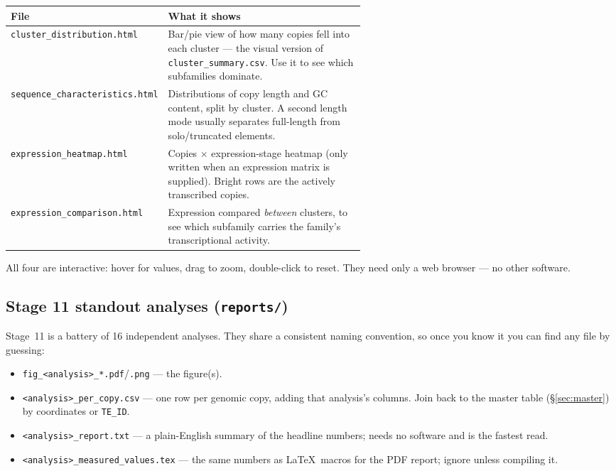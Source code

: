 \documentclass[11pt]{article}
\begin{document}
\begin{tabular}{@{}lp{0.58\linewidth}@{}}
\toprule
File & What it shows \\
\midrule
\texttt{cluster\_distribution.html}
  & Bar/pie view of how many copies fell into each cluster --- the visual
    version of \texttt{cluster\_summary.csv}. Use it to see which
    subfamilies dominate. \\[4pt]
\texttt{sequence\_characteristics.html}
  & Distributions of copy length and GC content, split by cluster.
    A second length mode usually separates full-length from
    solo/truncated elements. \\[4pt]
\texttt{expression\_heatmap.html}
  & Copies $\times$ expression-stage heatmap (only written when an
    expression matrix is supplied). Bright rows are the actively
    transcribed copies. \\[4pt]
\texttt{expression\_comparison.html}
  & Expression compared \emph{between} clusters, to see which subfamily
    carries the family's transcriptional activity. \\
\bottomrule
\end{tabular}

\medskip
All four are interactive: hover for values, drag to zoom, double-click to
reset. They need only a web browser --- no other software.

\subsection{Stage 11 standout analyses (\texttt{reports/})}
\label{sec:stage11}

Stage~11 is a battery of 16 independent analyses. They share a consistent
naming convention, so once you know it you can find any file by guessing:

\begin{itemize}[itemsep=2pt]
  \item \texttt{fig\_<analysis>\_*.pdf}/\texttt{.png} --- the figure(s).
  \item \texttt{<analysis>\_per\_copy.csv} --- one row per genomic copy,
        adding that analysis's columns. Join back to the master table
        (\S\ref{sec:master}) by coordinates or \texttt{TE\_ID}.
  \item \texttt{<analysis>\_report.txt} --- a plain-English summary of the
        headline numbers; needs no software and is the fastest read.
  \item \texttt{<analysis>\_measured\_values.tex} --- the same numbers as
        \LaTeX\ macros for the PDF report; ignore unless compiling it.
\end{itemize}
\end{document}

